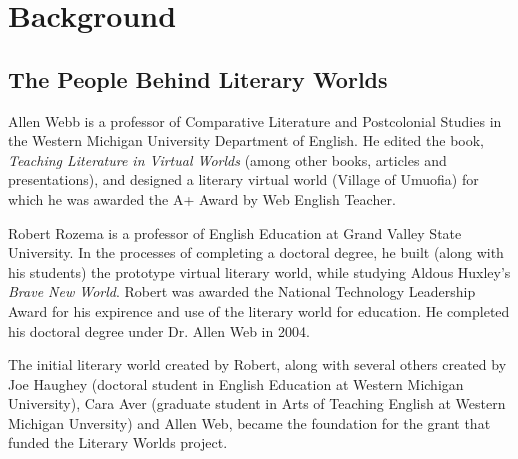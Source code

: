 \documentclass[12pt, letterpaper]{report}
\begin{document}
	
	\tableofcontents

%
	\chapter{Background}
	
	\section{The People Behind Literary Worlds}
	\par
	Allen Webb is a professor of Comparative Literature and Postcolonial Studies in the Western Michigan University Department of English. He edited the book, \textit{Teaching Literature in Virtual Worlds} (among other books, articles and presentations), and designed a literary virtual world (Village of Umuofia) for which he was awarded the A+ Award by Web English Teacher.
	
	\par
	Robert Rozema is a professor of English Education at Grand Valley State University.  In the processes of completing a doctoral degree, he built (along with his students) the prototype virtual literary world, while studying Aldous Huxley's \textit{Brave New World}. Robert was awarded the National Technology Leadership Award for his expirence and use of the literary world for education.  He completed his doctoral degree under Dr. Allen Web in 2004.
	
	\par
	The initial literary world created by Robert, along with several others created by Joe Haughey (doctoral student in English Education at Western Michigan University), Cara Aver (graduate student in Arts of Teaching English at Western Michigan Unversity) and Allen Web, became the foundation for the grant that funded the Literary Worlds project.
	
\end{document}
